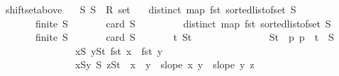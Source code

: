 \begin{isabellebody}
%
\endisatagproof
{\isafoldproof}%
%
\isadelimproof
\isanewline
%
\endisadelimproof
\isanewline
{}\isamarkupfalse%
\ shift{\isacharunderscore}{\kern0pt}set{\isacharunderscore}{\kern0pt}above{\isacharcolon}{\kern0pt}\isanewline
\ \ \ S{}\ S{}\ {\isacharcolon}{\kern0pt}{\isacharcolon}{\kern0pt}\ {\isachardoublequoteopen}R{}\ set{\isachardoublequoteclose}\isanewline
\isanewline
\ \ \ {\isachardoublequoteopen}distinct\ {\isacharparenleft}{\kern0pt}map\ fst\ {\isacharparenleft}{\kern0pt}sorted{\isacharunderscore}{\kern0pt}list{\isacharunderscore}{\kern0pt}of{\isacharunderscore}{\kern0pt}set\ S{}{\isacharparenright}{\kern0pt}{\isacharparenright}{\kern0pt}{\isachardoublequoteclose}\ \isanewline
\ \ \ \ \ \ \ {\isachardoublequoteopen}finite\ S{}{\isachardoublequoteclose}\isanewline
\ \ \ \ \ \ \ {\isachardoublequoteopen}card\ S{}\ {\isasymge}\ {}{\isachardoublequoteclose}\isanewline
\isanewline
\ \ \ \ \ \ \ {\isachardoublequoteopen}distinct\ {\isacharparenleft}{\kern0pt}map\ fst\ {\isacharparenleft}{\kern0pt}sorted{\isacharunderscore}{\kern0pt}list{\isacharunderscore}{\kern0pt}of{\isacharunderscore}{\kern0pt}set\ S{}{\isacharparenright}{\kern0pt}{\isacharparenright}{\kern0pt}{\isachardoublequoteclose}\isanewline
\ \ \ \ \ \ \ {\isachardoublequoteopen}finite\ S{}{\isachardoublequoteclose}\isanewline
\ \ \ \ \ \ \ {\isachardoublequoteopen}card\ S{}\ {\isasymge}\ {}{\isachardoublequoteclose}\isanewline
\isanewline
\ \ \ \ \ {\isachardoublequoteopen}{\isasymexists}t{\isachardot}{\kern0pt}\ {\isasymexists}S{}t{\isachardot}{\kern0pt}\isanewline
\ \ \ \ \ \ \ \ \ \ \ \ \ \ {\isacharparenleft}{\kern0pt}\ S{}t\ {\isacharequal}{\kern0pt}\ {\isacharparenleft}{\kern0pt}{\isasymlambda}p{\isachardot}{\kern0pt}\ p\ {\isacharplus}{\kern0pt}\ t{\isacharparenright}{\kern0pt}\ {\isacharbackquote}{\kern0pt}\ S{}\ {\isasymand}\isanewline
\ \ \ \ \ \ \ \ \ \ \ \ \ \ \ {\isacharparenleft}{\kern0pt}{\isasymforall}x{\isasymin}S{}{\isachardot}{\kern0pt}\ {\isasymforall}y{\isasymin}S{}t{\isachardot}{\kern0pt}\ fst\ x\ {\isacharless}{\kern0pt}\ fst\ y{\isacharparenright}{\kern0pt}\ {\isasymand}\isanewline
\ \ \ \ \ \ \ \ \ \ \ \ \ \ \ {\isacharparenleft}{\kern0pt}{\isasymforall}x{\isasymin}S{}{\isachardot}{\kern0pt}{\isasymforall}y{\isasymin}\ S{}{\isachardot}{\kern0pt}\ {\isasymforall}z{\isasymin}S{}t{\isachardot}{\kern0pt}\ \ x\ {\isacharless}{\kern0pt}\ y\ {\isasymlongrightarrow}\ slope\ x\ y\ {\isacharless}{\kern0pt}\ slope\ y\ z{\isacharparenright}{\kern0pt}\ {\isasymand}\isanewline

\end{isabellebody}
